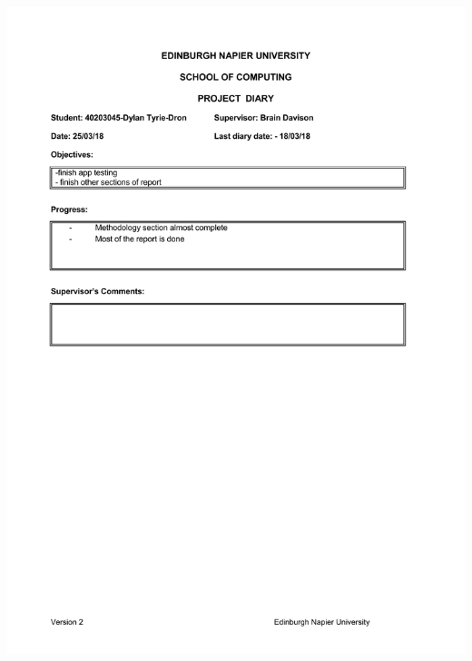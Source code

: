 \documentclass[12pt,a4paper]{article}
\begin{document}
\begin{appendices}
\includegraphics[width=\textwidth,height=\textheight,keepaspectratio]{project_diary_15th_entry.pdf}


\end{appendices}
\end{document}
